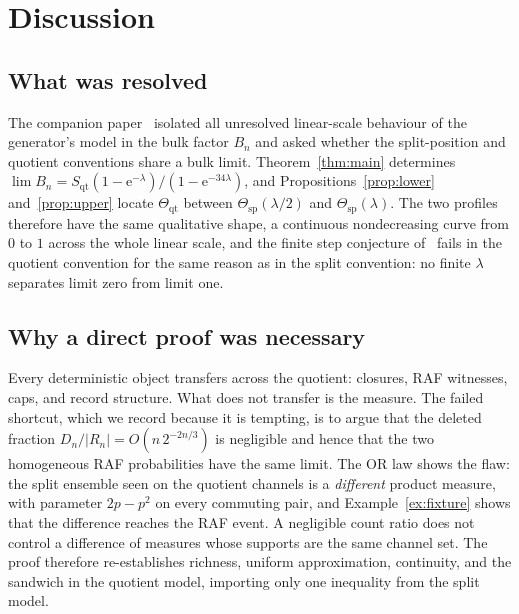 \documentclass[11pt,a4paper]{article}
\theoremstyle{plain}
\theoremstyle{definition}
\theoremstyle{remark}
\newcommand{\qt}{\mathrm{qt}}
\newcommand{\spc}{\mathrm{sp}}
\newcommand{\ee}{\mathrm{e}}
\begin{document}
\section{Discussion}\label{sec:discussion}

\subsection*{What was resolved}
The companion paper~\cite{overlapgateway2026} isolated all unresolved linear-scale behaviour of the generator's model in the bulk factor $B_n$ and asked whether the split-position and quotient conventions share a bulk limit. Theorem~\ref{thm:main} determines $\lim B_n=S_{\qt}(1-\ee^{-\lambda})/(1-\ee^{-34\lambda})$, and Propositions~\ref{prop:lower} and~\ref{prop:upper} locate $\Theta_{\qt}$ between $\Theta_{\spc}(\lambda/2)$ and $\Theta_{\spc}(\lambda)$. The two profiles therefore have the same qualitative shape, a continuous nondecreasing curve from $0$ to $1$ across the whole linear scale, and the finite step conjecture of~\cite[Eq.~(21)]{hordijk2016variable} fails in the quotient convention for the same reason as in the split convention: no finite $\lambda$ separates limit zero from limit one.

\subsection*{Why a direct proof was necessary}
Every deterministic object transfers across the quotient: closures, RAF witnesses, caps, and record structure. What does not transfer is the measure. The failed shortcut, which we record because it is tempting, is to argue that the deleted fraction $D_n/|R_n|=O(n\,2^{-2n/3})$ is negligible and hence that the two homogeneous RAF probabilities have the same limit. The OR law shows the flaw: the split ensemble seen on the quotient channels is a \emph{different} product measure, with parameter $2p-p^2$ on every commuting pair, and Example~\ref{ex:fixture} shows that the difference reaches the RAF event. A negligible count ratio does not control a difference of measures whose supports are the same channel set. The proof therefore re-establishes richness, uniform approximation, continuity, and the sandwich in the quotient model, importing only one inequality from the split model.
\end{document}

